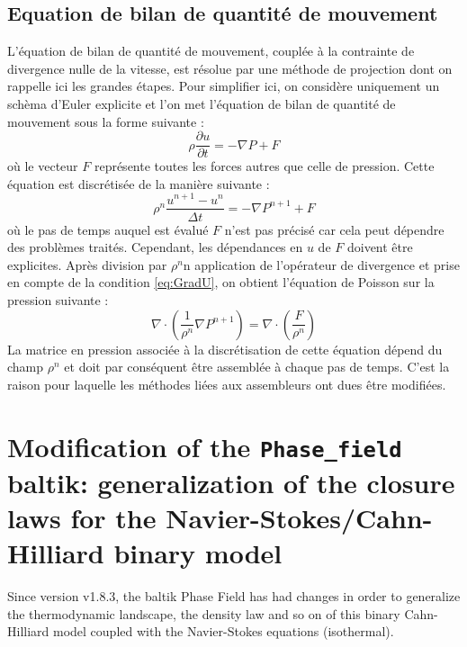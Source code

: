 \subsection{Equation de bilan de quantit\'e de mouvement}\label{subsec:EQ_bilan_QDM}
\medskip
L'\'equation de bilan de quantit\'e de mouvement, coupl\'ee \`a la contrainte de divergence nulle de la vitesse, est r\'esolue par une m\'ethode
de projection dont on rappelle ici les grandes \'etapes. Pour simplifier ici, on consid\`ere uniquement un sch\`ema d'Euler explicite et l'on met
l'\'equation de bilan de quantit\'e de mouvement sous la forme suivante :
\begin{equation}
\rho\frac{\partial u}{\partial t}=-\nabla P + F
\end{equation}
o\`u le vecteur $F$ repr\'esente toutes les forces autres que celle de pression.\newline
Cette \'equation est discr\'etis\'ee de la mani\`ere suivante :
\begin{equation}
\rho^n \frac{u^{n+1}-u^n}{\Delta t}=-\nabla P^{n+1}+F
\end{equation}
o\`u le pas de temps auquel est \'evalu\'e $F$ n'est pas pr\'ecis\'e car cela peut d\'ependre des probl\`emes trait\'es. Cependant, les
d\'ependances en $u$ de $F$ doivent \^etre explicites.\newline
Apr\`es division par $\rho^n$n application de l'op\'erateur de divergence et prise en compte de la condition \ref{eq:GradU}, on obtient l'\'equation de Poisson
sur la pression suivante :
\begin{equation}
\nabla\cdot\left(\frac{1}{\rho^n}\nabla P^{n+1}\right)=\nabla\cdot\left(\frac{F}{\rho^n}\right)
\end{equation}
La matrice en pression associ\'ee \`a la discr\'etisation de cette \'equation d\'epend du champ $\rho^n$ et doit par cons\'equent \^etre
assembl\'ee \`a chaque pas de temps. C'est la raison pour laquelle les m\'ethodes li\'ees aux assembleurs ont dues \^etre modifi\'ees.
\bigskip


\section{Modification of the \texttt{Phase\_field} baltik: generalization of the closure laws for the Navier-Stokes/Cahn-Hilliard binary model}
\medskip
Since version v1.8.3, the baltik Phase Field has had changes
in order  to generalize the thermodynamic landscape, the density law and
so on of this binary Cahn-Hilliard model coupled with the Navier-Stokes
equations (isothermal).
\medskip
